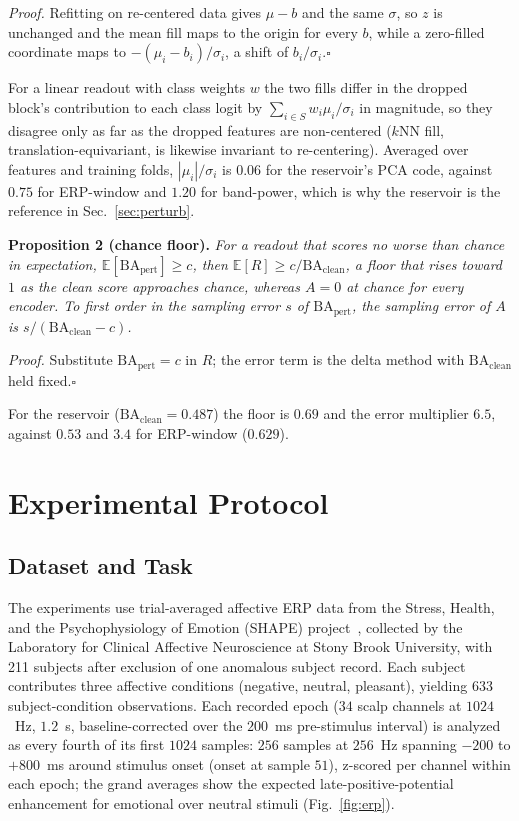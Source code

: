 \documentclass[conference]{IEEEtran}
\begin{document}
\noindent\emph{Proof.} Refitting on re-centered data gives $\mu-b$ and the same $\sigma$, so $z$ is unchanged and the mean fill maps to the origin for every $b$, while a zero-filled coordinate maps to $-(\mu_i-b_i)/\sigma_i$, a shift of $b_i/\sigma_i$.\hfill$\square$

For a linear readout with class weights $w$ the two fills differ in the dropped block's contribution to each class logit by $\sum_{i\in S}w_i\mu_i/\sigma_i$ in magnitude, so they disagree only as far as the dropped features are non-centered ($k$NN fill, translation-equivariant, is likewise invariant to re-centering). Averaged over features and training folds, $|\mu_i|/\sigma_i$ is $0.06$ for the reservoir's PCA code, against $0.75$ for ERP-window and $1.20$ for band-power, which is why the reservoir is the reference in Sec.~\ref{sec:perturb}.

\noindent\textbf{Proposition 2 (chance floor).} \emph{For a readout that scores no worse than chance in expectation, $\mathbb{E}[\mathrm{BA}_{\mathrm{pert}}]\ge c$, then $\mathbb{E}[R]\ge c/\mathrm{BA}_{\mathrm{clean}}$, a floor that rises toward $1$ as the clean score approaches chance, whereas $A=0$ at chance for every encoder. To first order in the sampling error $s$ of $\mathrm{BA}_{\mathrm{pert}}$, the sampling error of $A$ is $s/(\mathrm{BA}_{\mathrm{clean}}-c)$.}

\noindent\emph{Proof.} Substitute $\mathrm{BA}_{\mathrm{pert}}=c$ in $R$; the error term is the delta method with $\mathrm{BA}_{\mathrm{clean}}$ held fixed.\hfill$\square$

For the reservoir ($\mathrm{BA}_{\mathrm{clean}}=0.487$) the floor is $0.69$ and the error multiplier $6.5$, against $0.53$ and $3.4$ for ERP-window ($0.629$).

\section{Experimental Protocol}
\subsection{Dataset and Task}
\label{sec:data}
The experiments use trial-averaged affective ERP data from the Stress, Health, and the Psychophysiology of Emotion (SHAPE) project~\cite{shape}, collected by the Laboratory for Clinical Affective Neuroscience at Stony Brook University, with 211 subjects after exclusion of one anomalous subject record. Each subject contributes three affective conditions (negative, neutral, pleasant), yielding 633 subject-condition observations. Each recorded epoch ($34$ scalp channels at $1024$~Hz, $1.2$~s, baseline-corrected over the $200$~ms pre-stimulus interval) is analyzed as every fourth of its first $1024$ samples: $256$ samples at $256$~Hz spanning $-200$ to $+800$~ms around stimulus onset (onset at sample $51$), z-scored per channel within each epoch; the grand averages show the expected late-positive-potential enhancement for emotional over neutral stimuli (Fig.~\ref{fig:erp}).
\end{document}
